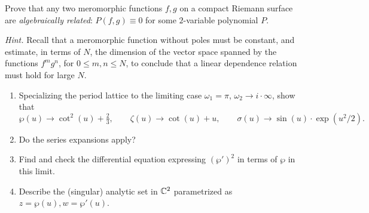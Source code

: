 \documentclass[12pt]{article}  %
\begin{document}
\begin{problem}[4 (from RS2)]
Prove that any two meromorphic functions $f,g$ on a compact Riemann surface are \emph{algebraically related}: $P(f,g)\equiv 0$ for some $2$-variable polynomial $P$.

\emph{Hint.} Recall that a meromorphic function without poles must be constant, and estimate, in terms of $N$, the dimension of the vector space spanned by the functions $f^m g^n$, for $0\le m,n\le N$, to conclude that a linear dependence relation must hold for large $N$.
\end{problem}

\begin{solution}
\end{solution}

\begin{problem}[5]
\begin{enumerate}
  \item Specializing the period lattice to the limiting case $\omega_1 = \pi$, $\omega_2 \to i\cdot\infty$, show that
  \[
    \wp(u) \to \cot^2(u) + \tfrac{2}{3}, \qquad
    \zeta(u) \to \cot(u)+u, \qquad
    \sigma(u) \to \sin(u)\cdot \exp(u^2/2).
  \]
  \item Do the series expansions apply?
  \item Find and check the differential equation expressing $(\wp')^2$ in terms of $\wp$ in this limit.
  \item Describe the (singular) analytic set in $\mathbb{C}^2$ parametrized as $z=\wp(u), w=\wp'(u)$.
\end{enumerate}
\end{problem}

\begin{solution}
\end{solution}
\end{document}
